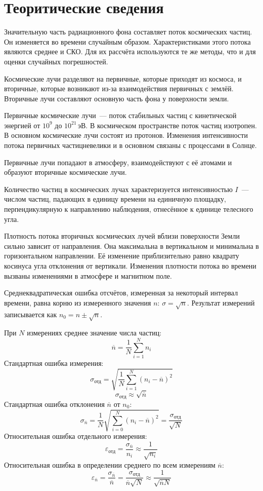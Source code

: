 \section{Теоритические сведения}
Значительную часть радиационного фона составляет поток
космических частиц. Он изменяется во времени случайным образом.
Характеристиками этого потока являются среднее и СКО. Для их рассчёта
используются те же методы, что и для оценки случайных погрешностей.

Космические лучи разделяют на первичные, которые приходят из космоса, и
вторичные, которые возникают из-за взаимодействия первичных с землёй.
Вторичные лучи составляют основную часть фона у поверхности земли.

Первичные космические лучи~--- поток стабильных частиц с кинетической
энергией от $10^9$ до $10^{21}\,\text{эВ}$. В космическом пространстве
поток частиц изотропен. В основном космические лучи состоят из протонов.
Изменения интенсивности потока первичных частицневелики и  в основном
связаны с процессами в Солнце.

Первичные лучи попадают в атмосферу, взаимодействуют с её атомами и образуют
вторичные космические лучи.

Количество частиц в космических лучах характеризуется интенсивностью $I$~---
числом частиц, падающих в единицу времени на единичную площадку, перпендикулярную
к направлению наблюдения, отнесённое к единице телесного угла.

Плотность потока вторичных космических лучей вблизи поверхности Земли
сильно зависит от направления. Она максимальна в вертикальном и минимальна
в горизонтальном направлении. Её изменение приблизительно равно квадрату косинуса
угла отклонения от вертикали. Изменения плотности потока во времени вызваны
изменениями в атмосфере и магнитном поле.

Среднеквадратическая ошибка отсчётов, измеренная за некоторый интервал времени,
равна корню из измеренного значения $n$: $\sigma=\sqrt{n}$. Результат измерений
записывается как $n_0=n\pm\sqrt{n}$.

При $N$ измерениях среднее значение числа частиц:
\[\overline{n}=\frac{1}{N}\sum_{i=1}^N n_i\]
Стандартная ошибка измерения:
\[\sigma_\text{отд}=\sqrt{\frac{1}{N}\sum_{i=1}^{N}\left(n_i-\overline{n}\right)^2}\]
\[\sigma_\text{отд}\approx\sqrt{\overline{n}}\]
Стандартная ошибка отклонения $\overline{n}$ от $n_0$:
\[\sigma_{\overline{n}}=\frac{1}{N}\sqrt{\sum_{i=0}^N \left(n_i - \overline{n}\right)^2}=\frac{\sigma_\text{отд}}{\sqrt{N}}\]
Относительная ошибка отдельного измерения:
\[\varepsilon_\text{отд}=\frac{\sigma_{\overline{n}}}{n_i}\approx\frac{1}{\sqrt{n_i}}\]
Относительная ошибка в определении среднего по всем измерениям $\overline{n}$:
\[\varepsilon_{\overline{n}}=\frac{\sigma_{\overline{n}}}{\overline{n}}=\frac{\sigma_\text{отд}}{\overline{n}\sqrt{N}}\approx\frac{1}{\sqrt{\overline{n}N}}\]
